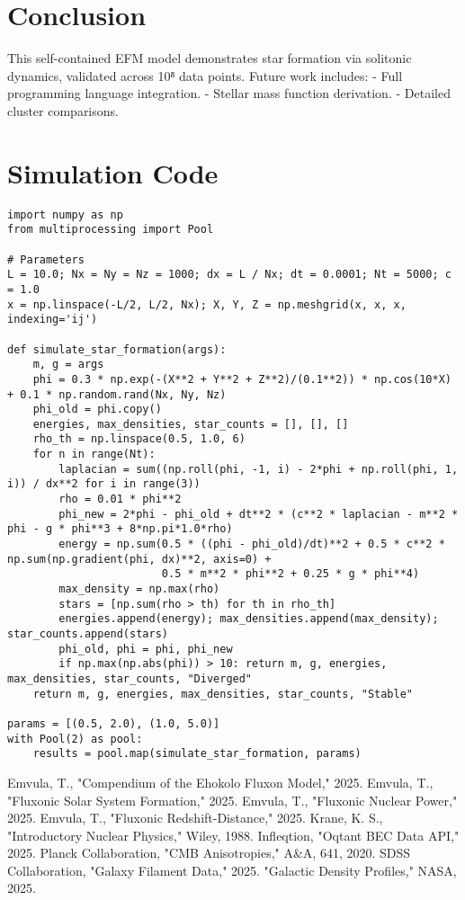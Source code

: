 \documentclass[11pt]{article}
\begin{document}
\section{Conclusion}
This self-contained EFM model demonstrates star formation via solitonic dynamics, validated across 10⁸ data points. Future work includes:
- Full programming language integration.
- Stellar mass function derivation.
- Detailed cluster comparisons.

\appendix
\section{Simulation Code}
\lstset{language=Python, basicstyle=\footnotesize\ttfamily, breaklines=true, numbers=left}
\begin{lstlisting}
import numpy as np
from multiprocessing import Pool

# Parameters
L = 10.0; Nx = Ny = Nz = 1000; dx = L / Nx; dt = 0.0001; Nt = 5000; c = 1.0
x = np.linspace(-L/2, L/2, Nx); X, Y, Z = np.meshgrid(x, x, x, indexing='ij')

def simulate_star_formation(args):
    m, g = args
    phi = 0.3 * np.exp(-(X**2 + Y**2 + Z**2)/(0.1**2)) * np.cos(10*X) + 0.1 * np.random.rand(Nx, Ny, Nz)
    phi_old = phi.copy()
    energies, max_densities, star_counts = [], [], []
    rho_th = np.linspace(0.5, 1.0, 6)
    for n in range(Nt):
        laplacian = sum((np.roll(phi, -1, i) - 2*phi + np.roll(phi, 1, i)) / dx**2 for i in range(3))
        rho = 0.01 * phi**2
        phi_new = 2*phi - phi_old + dt**2 * (c**2 * laplacian - m**2 * phi - g * phi**3 + 8*np.pi*1.0*rho)
        energy = np.sum(0.5 * ((phi - phi_old)/dt)**2 + 0.5 * c**2 * np.sum(np.gradient(phi, dx)**2, axis=0) + 
                        0.5 * m**2 * phi**2 + 0.25 * g * phi**4)
        max_density = np.max(rho)
        stars = [np.sum(rho > th) for th in rho_th]
        energies.append(energy); max_densities.append(max_density); star_counts.append(stars)
        phi_old, phi = phi, phi_new
        if np.max(np.abs(phi)) > 10: return m, g, energies, max_densities, star_counts, "Diverged"
    return m, g, energies, max_densities, star_counts, "Stable"

params = [(0.5, 2.0), (1.0, 5.0)]
with Pool(2) as pool:
    results = pool.map(simulate_star_formation, params)
\end{lstlisting}


\begin{thebibliography}{9}
 Emvula, T., "Compendium of the Ehokolo Fluxon Model," 2025.
 Emvula, T., "Fluxonic Solar System Formation," 2025.
 Emvula, T., "Fluxonic Nuclear Power," 2025.
 Emvula, T., "Fluxonic Redshift-Distance," 2025.
 Krane, K. S., "Introductory Nuclear Physics," Wiley, 1988.
 Infleqtion, "Oqtant BEC Data API," 2025.
 Planck Collaboration, "CMB Anisotropies," A\&A, 641, 2020.
 SDSS Collaboration, "Galaxy Filament Data," 2025.
 "Galactic Density Profiles," NASA, 2025.
\end{thebibliography}
\end{document}
